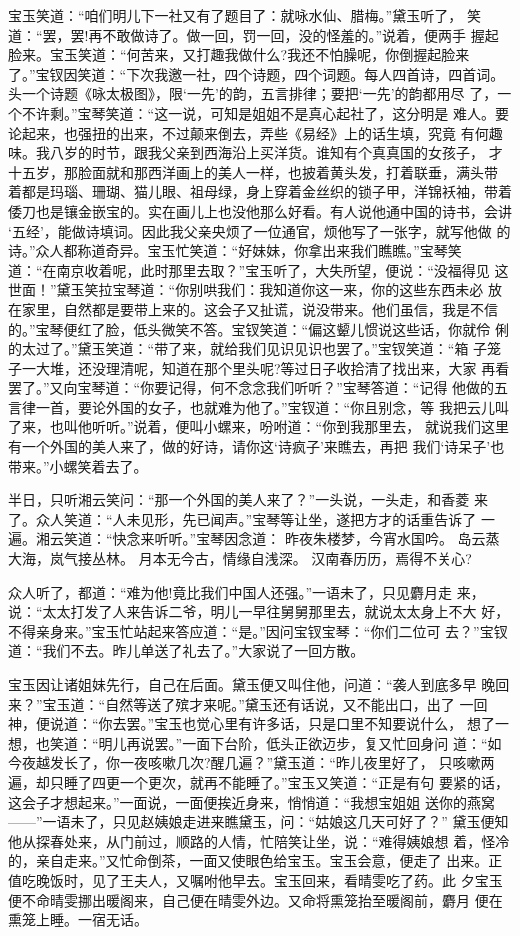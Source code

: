 宝玉笑道：“咱们明儿下一社又有了题目了：就咏水仙、腊梅。”黛玉听了，
笑道：“罢，罢!再不敢做诗了。做一回，罚一回，没的怪羞的。”说着，便两手
握起脸来。宝玉笑道：“何苦来，又打趣我做什么?我还不怕臊呢，你倒握起脸来
了。”宝钗因笑道：“下次我邀一社，四个诗题，四个词题。每人四首诗，四首词。
头一个诗题《咏太极图》，限‘一先’的韵，五言排律；要把‘一先’的韵都用尽
了，一个不许剩。”宝琴笑道：“这一说，可知是姐姐不是真心起社了，这分明是
难人。要论起来，也强扭的出来，不过颠来倒去，弄些《易经》上的话生填，究竟
有何趣味。我八岁的时节，跟我父亲到西海沿上买洋货。谁知有个真真国的女孩子，
才十五岁，那脸面就和那西洋画上的美人一样，也披着黄头发，打着联垂，满头带
着都是玛瑙、珊瑚、猫儿眼、祖母绿，身上穿着金丝织的锁子甲，洋锦袄袖，带着
倭刀也是镶金嵌宝的。实在画儿上也没他那么好看。有人说他通中国的诗书，会讲
‘五经’，能做诗填词。因此我父亲央烦了一位通官，烦他写了一张字，就写他做
的诗。”众人都称道奇异。宝玉忙笑道：“好妹妹，你拿出来我们瞧瞧。”宝琴笑
道：“在南京收着呢，此时那里去取？”宝玉听了，大失所望，便说：“没福得见
这世面！”黛玉笑拉宝琴道：“你别哄我们：我知道你这一来，你的这些东西未必
放在家里，自然都是要带上来的。这会子又扯谎，说没带来。他们虽信，我是不信
的。”宝琴便红了脸，低头微笑不答。宝钗笑道：“偏这颦儿惯说这些话，你就伶
俐的太过了。”黛玉笑道：“带了来，就给我们见识见识也罢了。”宝钗笑道：“箱
子笼子一大堆，还没理清呢，知道在那个里头呢?等过日子收拾清了找出来，大家
再看罢了。”又向宝琴道：“你要记得，何不念念我们听听？”宝琴答道：“记得
他做的五言律一首，要论外国的女子，也就难为他了。”宝钗道：“你且别念，等
我把云儿叫了来，也叫他听听。”说着，便叫小螺来，吩咐道：“你到我那里去，
就说我们这里有一个外国的美人来了，做的好诗，请你这‘诗疯子’来瞧去，再把
我们‘诗呆子’也带来。”小螺笑着去了。

半日，只听湘云笑问：“那一个外国的美人来了？”一头说，一头走，和香菱
来了。众人笑道：“人未见形，先已闻声。”宝琴等让坐，遂把方才的话重告诉了
一遍。湘云笑道：“快念来听听。”宝琴因念道：
昨夜朱楼梦，今宵水国吟。
岛云蒸大海，岚气接丛林。
月本无今古，情缘自浅深。
汉南春历历，焉得不关心?

众人听了，都道：“难为他!竟比我们中国人还强。”一语未了，只见麝月走
来，说：“太太打发了人来告诉二爷，明儿一早往舅舅那里去，就说太太身上不大
好，不得亲身来。”宝玉忙站起来答应道：“是。”因问宝钗宝琴：“你们二位可
去？”宝钗道：“我们不去。昨儿单送了礼去了。”大家说了一回方散。

宝玉因让诸姐妹先行，自己在后面。黛玉便又叫住他，问道：“袭人到底多早
晚回来？”宝玉道：“自然等送了殡才来呢。”黛玉还有话说，又不能出口，出了
一回神，便说道：“你去罢。”宝玉也觉心里有许多话，只是口里不知要说什么，
想了一想，也笑道：“明儿再说罢。”一面下台阶，低头正欲迈步，复又忙回身问
道：“如今夜越发长了，你一夜咳嗽几次?醒几遍？”黛玉道：“昨儿夜里好了，
只咳嗽两遍，却只睡了四更一个更次，就再不能睡了。”宝玉又笑道：“正是有句
要紧的话，这会子才想起来。”一面说，一面便挨近身来，悄悄道：“我想宝姐姐
送你的燕窝——”一语未了，只见赵姨娘走进来瞧黛玉，问：“姑娘这几天可好了？”
黛玉便知他从探春处来，从门前过，顺路的人情，忙陪笑让坐，说：“难得姨娘想
着，怪冷的，亲自走来。”又忙命倒茶，一面又使眼色给宝玉。宝玉会意，便走了
出来。正值吃晚饭时，见了王夫人，又嘱咐他早去。宝玉回来，看晴雯吃了药。此
夕宝玉便不命晴雯挪出暖阁来，自己便在晴雯外边。又命将熏笼抬至暖阁前，麝月
便在熏笼上睡。一宿无话。

